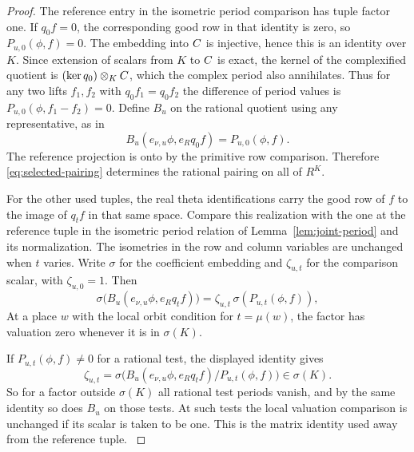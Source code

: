 \begin{proof}
The reference entry in the isometric period comparison
has tuple factor one. If \(q_0 f=0\), the corresponding
good row in that identity is zero, so \(P_{u,0}(\phi,f)=0\).
The embedding into \(C\) is injective, hence this is an
identity over \(K\). Since extension of scalars from \(K\) to
\(C\) is exact, the kernel of the complexified quotient is
\((\ker q_0)\otimes_KC\), which the complex period also
annihilates. Thus for any two lifts \(f_1,f_2\) with
\(q_0 f_1=q_0 f_2\) the difference of period values is
\(P_{u,0}(\phi,f_1-f_2)=0\). Define \(B_u\) on the rational
quotient using any representative, as in
\begin{equation}\label{eq:selected-pairing}
 B_u(e_{\nu,u}\phi,e_R q_0 f)=P_{u,0}(\phi,f).
\end{equation}
The reference projection is onto by the primitive row
comparison. Therefore \eqref{eq:selected-pairing} determines
the rational pairing on all of \(R^K\).
\label{cor:selected-period-3}

For the other used tuples, the real theta identifications carry the good row of \(f\) to the image of \(q_t f\) in that same space. Compare this realization with the one at the reference tuple
in the isometric period relation of
Lemma~\ref{lem:joint-period} and its normalization. The
isometries in the row and column variables are unchanged
when \(t\) varies. Write \(\sigma\) for the coefficient embedding
and \(\zeta_{u,t}\) for the comparison scalar, with
\(\zeta_{u,0}=1\). Then
\[
 \sigma\bigl(B_u(e_{\nu,u}\phi,e_R q_t f)\bigr)
       =\zeta_{u,t}\,\sigma(P_{u,t}(\phi,f)),
\]
At a place \(w\) with the local orbit condition for \(t=\mu(w)\),
the factor has valuation zero whenever it is in \(\sigma(K)\).

If \(P_{u,t}(\phi,f)\ne0\) for a rational test, the displayed
identity gives
\[
 \zeta_{u,t}
  =\sigma\bigl(B_u(e_{\nu,u}\phi,e_Rq_tf)/P_{u,t}(\phi,f)\bigr)
       \in\sigma(K).
\]
So for a factor outside \(\sigma(K)\) all rational test
periods vanish, and by the same identity so does \(B_u\) on
those tests. At such tests the local valuation comparison
is unchanged if its scalar is taken to be one. This is the matrix identity used
away from the reference tuple.
\label{cor:selected-period-4}


\end{proof}
